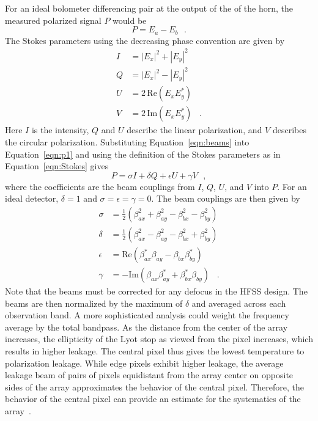 For an ideal bolometer differencing pair at the output of the of the horn, the measured polarized signal $P$ would be
\begin{equation}\label{eqn:p1}
P=E_a-E_b \,\,\,\,.
\end{equation}
The Stokes parameters using the decreasing phase convention are given by
\begin{align}\label{eqn:Stokes}
I & =  |E_{x}|^2+ |E_{y}|^2  \nonumber \\
Q & =   |E_{x}|^2- |E_{y}|^2  \nonumber \\
U & =  2\,\mathrm{Re}(E_{x} E_{y}^{*}) \nonumber \\
V & =  2\,\mathrm{Im}(E_{x} E_{y}^{*})\,\,\,\,\,.
\end{align}
Here $I$ is the intensity, $Q$ and $U$ describe the linear polarization, and $V$ describes the circular polarization. Substituting Equation~\ref{eqn:beams} into Equation~\ref{eqn:p1} and using the definition of the Stokes parameters  as in Equation~\ref{eqn:Stokes} gives
\begin{equation}
P=\sigma I + \delta Q + \epsilon U+ \gamma V\,\,\,\, ,
\end{equation}
where the coefficients are the beam couplings from $I$, $Q$, $U$, and $V$ into $P$. For an ideal detector, $\delta=1$ and $\sigma=\epsilon=\gamma=0$. The beam couplings are then given by
\begin{align}\label{eqn:leakage beams}
\sigma & =  \frac{1}{2} (\beta_{ax}^2 + \beta_{ay}^2 - \beta_{bx}^2 - \beta_{by}^2) \\
\delta & =   \frac{1}{2} (\beta_{ax}^2 - \beta_{ay}^2 - \beta_{bx}^2 + \beta_{by}^2) \\
\epsilon & =  \mathrm{Re}(\beta_{ax}^{*} \beta_{ay} - \beta_{bx}\beta_{by}^{*} )  \\
\gamma & =  -\mathrm{Im}(\beta_{ax} \beta_{ay}^{*} + \beta_{bx}^{*}\beta_{by} )\,\,\,\,\,.
\end{align}
Note that the beams must be corrected for any defocus in the HFSS design. The beams are then normalized by the maximum of $\delta$ and averaged across each observation band. A more sophisticated analysis could weight the frequency average by the total bandpass. As the distance from the center of the array increases, the ellipticity of the Lyot stop as viewed from the pixel increases, which results in higher leakage. The central pixel thus gives the lowest temperature to polarization leakage. While edge pixels exhibit higher leakage, the average leakage beam of pairs of pixels equidistant from the array center on opposite sides of the array approximates the behavior of the central pixel. Therefore, the behavior of the central pixel can provide an estimate for the systematics of the array~\cite{Simon_Thesis_2016}.

